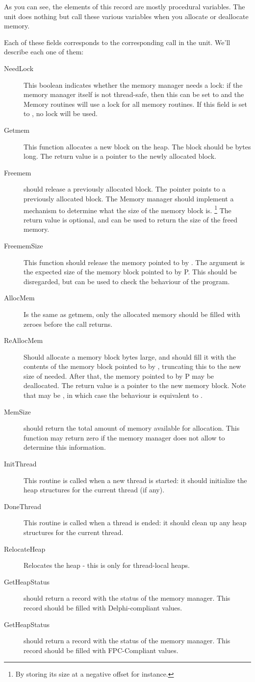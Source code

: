As you can see, the elements of this record are mostly procedural variables.
The  unit does nothing but call these various variables when you
allocate or deallocate memory.

Each of these fields corresponds to the corresponding call in the 
unit. We'll describe each one of them:
\begin{description}
\item[NeedLock] This boolean indicates whether the memory manager needs a lock:
if the memory manager itself is not thread-safe, then this can be set to
 and the Memory routines will use a lock for all memory routines. 
If this field is set to , no lock will be used.
\item[Getmem] This function allocates a new block on the heap. The block
should be  bytes long. The return value is a pointer to the newly
allocated block.
\item[Freemem] should release a previously allocated block. The pointer
 points to a previously allocated block. The Memory manager should
implement a mechanism to determine what the size of the memory block is.
\footnote{By storing its size at a negative offset for instance.} The
return value is optional, and can be used to return the size of the freed
memory.
\item[FreememSize] This function should release the memory pointed to by
. The argument  is the expected size of the memory block
pointed to by P. This should be disregarded, but can be used to check the
behaviour of the program.
\item[AllocMem] Is the same as getmem, only the allocated memory should
be filled with zeroes before the call returns.
\item[ReAllocMem] Should allocate a memory block  bytes large,
and should fill it with the contents of the memory block pointed to by
, truncating this to the new size of needed. After that, the memory
pointed to by P may be deallocated. The return value is a pointer to the
new memory block. Note that  may be , in which case the
behaviour is equivalent to .
\item[MemSize] should return the total amount of memory available for
allocation. This function may return zero if the memory manager does not
allow to determine this information.
\item[InitThread] This routine is called when a new thread is started:
it should initialize the heap structures for the current thread (if any).
\item[DoneThread] This routine is called when a thread is ended:
it should clean up any heap structures for the current thread.
\item[RelocateHeap] Relocates the heap - this is only for thread-local
heaps.
\item[GetHeapStatus] should return a  record with the
status of the memory manager. This record should be filled with
Delphi-compliant values.
\item[GetHeapStatus] should return a  record with the
status of the memory manager. This record should be filled with
FPC-Compliant values.
\end{description}
